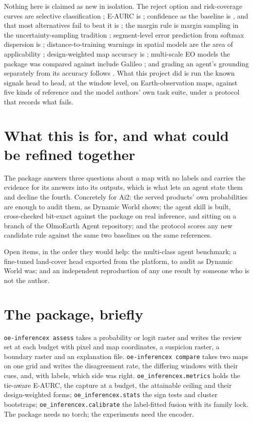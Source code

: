 \documentclass[11pt,a4paper]{article}
\begin{document}
Nothing here is claimed as new in isolation. The reject option and
risk-coverage curves are selective classification \citep{chow1970,geifman2017};
E-AURC is \citet{geifman2019}; confidence as the baseline is
\citet{hendrycks2017}, and that most alternatives fail to beat it is
\citet{jaeger2023}; the margin rule is margin sampling \citep{scheffer2001} in
the uncertainty-sampling tradition \citep{lewis1994}; segment-level error
prediction from softmax dispersion is \citet{rottmann2020}; distance-to-training
warnings in spatial models are the area of applicability \citep{meyer2021};
design-weighted map accuracy is \citet{olofsson2014}; multi-scale EO models the
package was compared against include Galileo \citep{tseng2025}; and grading an
agent's grounding separately from its accuracy follows \citet{bansal2021}. What
this project did is run the known signals head to head, at the window level, on
Earth-observation maps, against five kinds of reference and the model authors'
own task suite, under a protocol that records what fails.

\section{What this is for, and what could be refined together}

The package answers three questions about a map with no labels and carries the
evidence for its answers into its outputs, which is what lets an agent state
them and decline the fourth. Concretely for Ai2: the served products' own
probabilities are enough to audit them, as Dynamic World shows; the agent skill
is built, cross-checked bit-exact against the package on real inference, and
sitting on a branch of the OlmoEarth Agent repository; and the protocol scores
any new candidate rule against the same two baselines on the same references.

Open items, in the order they would help: the multi-class agent benchmark; a
fine-tuned land-cover head exported from the platform, to audit as Dynamic World
was; and an independent reproduction of any one result by someone who is not
the author.




\appendix
\sloppy
\section{The package, briefly}

\texttt{oe-inferencex assess} takes a probability or logit raster and writes the
review set at each budget with pixel and map coordinates, a suspicion raster, a
boundary raster and an explanation file. \texttt{oe-inferencex compare} takes
two maps on one grid and writes the disagreement rate, the differing windows with
their cues, and, with labels, which side was right. \texttt{oe\_inferencex.metrics}
holds the tie-aware E-AURC, the capture at a budget, the attainable ceiling and
their design-weighted forms; \texttt{oe\_inferencex.stats} the sign tests and
cluster bootstraps; \texttt{oe\_inferencex.calibrate} the label-fitted fusion with
its family lock. The package needs no torch; the experiments need the encoder.
\end{document}
